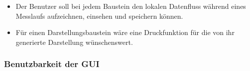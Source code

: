 \documentclass[parskip=full]{scrartcl}
\begin{document}
\begin{itemize}
	\item 
	\begin{WunschKrit} 			
		Der Benutzer soll bei jedem Baustein den lokalen Datenfluss während eines Messlaufs aufzeichnen, einsehen und speichern können. 
	\end{WunschKrit}
		
	\item
	\begin{WunschKrit} 
		Für einen Darstellungsbaustein wäre eine Druckfunktion für die von ihr generierte Darstellung wünschenswert. 
	\end{WunschKrit}
	
	
\end{itemize}



\subsubsection {Benutzbarkeit der GUI}
\end{document}
